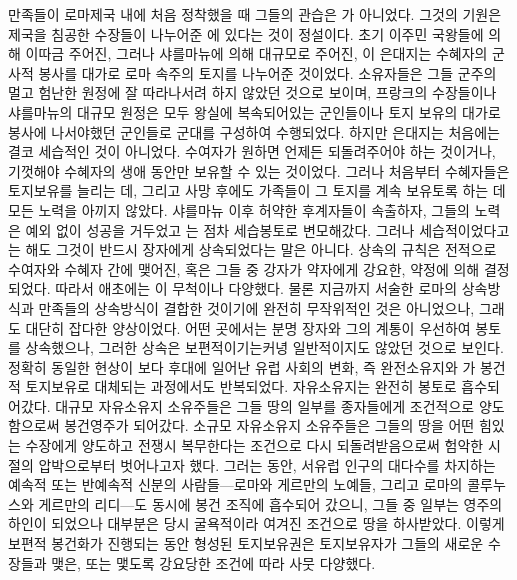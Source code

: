 만족들이 로마제국 내에 처음 정착했을 때
그들의 관습은 가 아니었다.
그것의 기원은 제국을 침공한 수장들이 나누어준
에 있다는 것이 정설이다.
초기 이주민 국왕들에 의해 이따금 주어진,
그러나 샤를마뉴에 의해 대규모로 주어진,
이 은대지는 수혜자의 군사적 봉사를 대가로
로마 속주의 토지를 나누어준 것이었다.
 소유자들은 그들 군주의 멀고 험난한 원정에
잘 따라나서려 하지 않았던 것으로 보이며,
프랑크의 수장들이나 샤를마뉴의 대규모 원정은
모두
왕실에 복속되어있는 군인들이나
토지 보유의 대가로 봉사에 나서야했던 군인들로
군대를 구성하여 수행되었다.
하지만 은대지는 처음에는 결코 세습적인 것이 아니었다.
수여자가 원하면 언제든 되돌려주어야 하는 것이거나,
기껏해야 수혜자의 생애 동안만 보유할 수 있는 것이었다.
그러나 처음부터 수혜자들은 토지보유를 늘리는 데, 그리고
사망 후에도 가족들이 그 토지를 계속 보유토록 하는 데
모든 노력을 아끼지 않았다.
샤를마뉴 이후 허약한 후계자들이 속출하자,
그들의 노력은 예외 없이 성공을 거두었고
는 점차 세습봉토로 변모해갔다.
그러나 세습적이었다고는 해도 그것이 반드시
장자에게 상속되었다는 말은 아니다.
상속의 규칙은 전적으로 수여자와 수혜자 간에 맺어진,
혹은 그들 중 강자가 약자에게 강요한,
약정에 의해 결정되었다.
따라서 애초에는 이 무척이나 다양했다.
물론 지금까지 서술한 로마의 상속방식과 만족들의 상속방식이
결합한 것이기에 완전히 무작위적인 것은 아니었으나,
그래도 대단히 잡다한 양상이었다.
어떤 곳에서는 분명 장자와 그의 계통이 우선하여 봉토를 상속했으나,
그러한 상속은 보편적이기는커녕 일반적이지도 않았던 것으로 보인다.
정확히 동일한 현상이
보다 후대에 일어난 유럽 사회의 변화,
즉  완전소유지와
 가
봉건적 토지보유로 대체되는 과정에서도
반복되었다.
자유소유지는 완전히 봉토로 흡수되어갔다.
대규모 자유소유지 소유주들은
그들 땅의 일부를 종자들에게 조건적으로 양도함으로써
봉건영주가 되어갔다.
소규모 자유소유지 소유주들은
그들의 땅을 어떤 힘있는 수장에게 양도하고
전쟁시 복무한다는 조건으로 다시 되돌려받음으로써
험악한 시절의 압박으로부터 벗어나고자 했다.
그러는 동안,
서유럽 인구의 대다수를 차지하는
예속적 또는 반예속적 신분의 사람들---로마와 게르만의 노예들,
그리고 로마의 콜루누스와 게르만의 리디---도
동시에
봉건 조직에 흡수되어 갔으니,
그들 중 일부는 영주의 하인이 되었으나
대부분은 당시 굴욕적이라 여겨진 조건으로 땅을 하사받았다.
이렇게 보편적 봉건화가 진행되는 동안 형성된 토지보유권은
토지보유자가 그들의 새로운 수장들과 맺은, 또는
맻도록 강요당한 조건에 따라 사뭇 다양했다.
